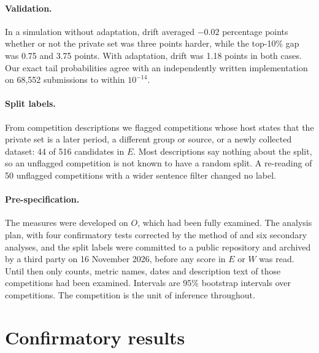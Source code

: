 \documentclass[10pt]{article}
\begin{document}
\paragraph{Validation.} In a simulation without adaptation, drift averaged $-0.02$ percentage points whether or not the private set was three points harder, while the top-10\% gap was 0.75 and 3.75 points. With adaptation, drift was 1.18 points in both cases. Our exact tail probabilities agree with an independently written implementation on 68,552 submissions to within $10^{-14}$.

\paragraph{Split labels.} From competition descriptions we flagged competitions whose host states that the private set is a later period, a different group or source, or a newly collected dataset: 44 of 516 candidates in $E$. Most descriptions say nothing about the split, so an unflagged competition is not known to have a random split. A re-reading of 50 unflagged competitions with a wider sentence filter changed no label.

\paragraph{Pre-specification.} The measures were developed on $O$, which had been fully examined. The analysis plan, with four confirmatory tests corrected by the method of \citet{holm1979} and six secondary analyses, and the split labels were committed to a public repository and archived by a third party on 16 November 2026, before any score in $E$ or $W$ was read. Until then only counts, metric names, dates and description text of those competitions had been examined. Intervals are 95\% bootstrap intervals over competitions. The competition is the unit of inference throughout.

\section{Confirmatory results}
\label{sec:confirm}
\end{document}
